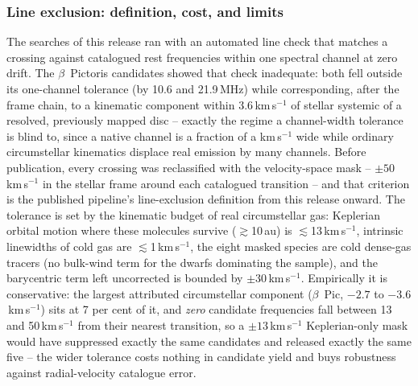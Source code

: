 \documentclass{openjournal}
\begin{document}
\subsubsection*{Line exclusion: definition, cost, and limits}

The searches of this release ran with an automated line check that
matches a crossing against catalogued rest frequencies within one
spectral channel at zero drift. The $\beta$~Pictoris candidates
showed that check inadequate: both fell outside its one-channel
tolerance (by 10.6 and 21.9\,MHz) while corresponding, after the
frame chain, to a kinematic component within 3.6\,km\,s$^{-1}$ of
stellar systemic of a resolved, previously mapped disc -- exactly the
regime a channel-width tolerance is blind to, since a native channel
is a fraction of a km\,s$^{-1}$ wide while ordinary circumstellar
kinematics displace real emission by many channels. Before
publication, every crossing was reclassified with the
velocity-space mask -- $\pm50$\,km\,s$^{-1}$ in the stellar frame
around each catalogued transition -- and that criterion is the
published pipeline's line-exclusion definition from this release
onward. The tolerance is set by the kinematic budget of real
circumstellar gas: Keplerian orbital motion where these molecules
survive ($\gtrsim$10\,au) is $\lesssim$13\,km\,s$^{-1}$, intrinsic
linewidths of cold gas are $\lesssim$1\,km\,s$^{-1}$, the eight
masked species are cold dense-gas tracers (no bulk-wind term for the
dwarfs dominating the sample), and the barycentric term left
uncorrected is bounded by $\pm$30\,km\,s$^{-1}$. Empirically it is
conservative: the largest attributed circumstellar component
($\beta$~Pic, $-2.7$ to $-3.6$\,km\,s$^{-1}$) sits at 7 per cent of
it, and \emph{zero} candidate frequencies fall between 13 and
50\,km\,s$^{-1}$ from their nearest transition, so a
$\pm13$\,km\,s$^{-1}$ Keplerian-only mask would have suppressed
exactly the same candidates and released exactly the same five -- the
wider tolerance costs nothing in candidate yield and buys robustness
against radial-velocity catalogue error.
\end{document}
